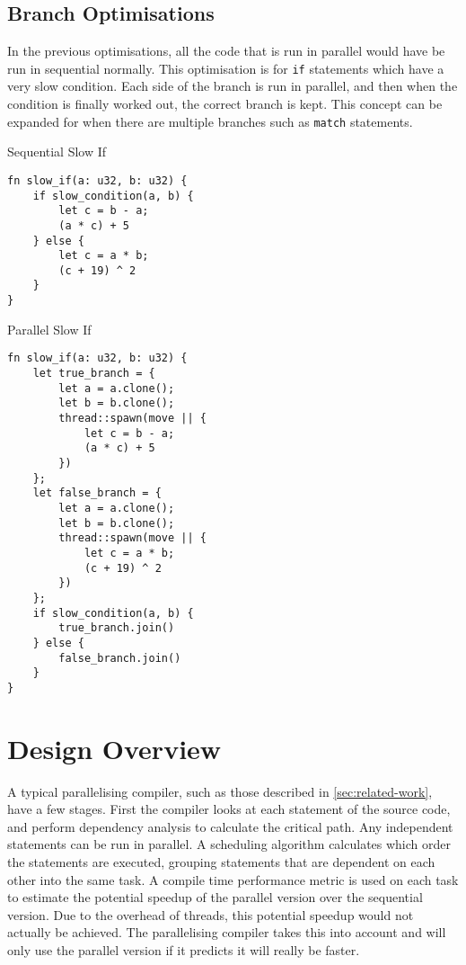 \documentclass[conference]{IEEEtran}
\begin{document}
\subsection{Branch Optimisations}
In the previous optimisations, all the code that is run in parallel would have be run in sequential normally. This optimisation is for \texttt{if} statements which have a very slow condition. Each side of the branch is run in parallel, and then when the condition is finally worked out, the correct branch is kept. This concept can be expanded for when there are multiple branches such as \texttt{match} statements.


\begin{algorithm}
\caption{Sequential Slow If}
\label{code:seq-slowif}
\begin{verbatim}
fn slow_if(a: u32, b: u32) {
    if slow_condition(a, b) {
        let c = b - a;
        (a * c) + 5
    } else {
        let c = a * b;
        (c + 19) ^ 2
    }
}
\end{verbatim}
\end{algorithm}

\begin{algorithm}
\caption{Parallel Slow If}
\label{code:par-slowif}
\begin{verbatim}
fn slow_if(a: u32, b: u32) {
    let true_branch = {
        let a = a.clone();
        let b = b.clone();
        thread::spawn(move || {
            let c = b - a;
            (a * c) + 5
        })
    };
    let false_branch = {
        let a = a.clone();
        let b = b.clone();
        thread::spawn(move || {
            let c = a * b;
            (c + 19) ^ 2
        })
    };
    if slow_condition(a, b) {
        true_branch.join()
    } else {
        false_branch.join()
    }
}

\end{verbatim}
\end{algorithm}

\section{Design Overview}
\label{sec:design}
A typical parallelising compiler, such as those described in \autoref{sec:related-work}, have a few stages. First the compiler looks at each statement of the source code, and perform dependency analysis to calculate the critical path. Any independent statements can be run in parallel. A scheduling algorithm calculates which order the statements are executed, grouping statements that are dependent on each other into the same task. A compile time performance metric is used on each task to estimate the potential speedup of the parallel version over the sequential version. Due to the overhead of threads, this potential speedup would not actually be achieved. The parallelising compiler takes this into account and will only use the parallel version if it predicts it will really be faster.
\end{document}

